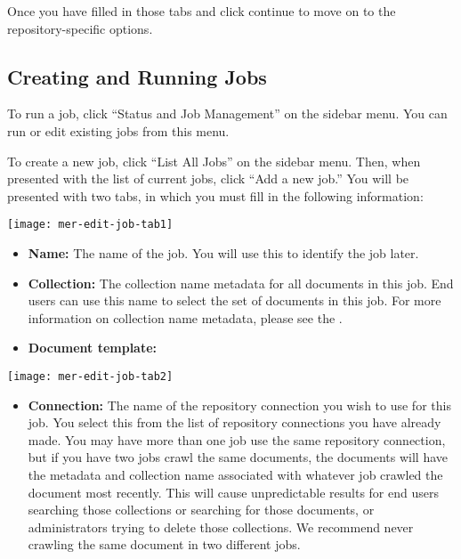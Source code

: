 \begin{changemargin}{1.5in}{0in}


Once you have filled in those tabs and click continue to move on to
the repository-specific options.



\subsection{Creating and Running Jobs}

To run a job, click ``Status and Job Management'' on the sidebar menu.
You can run or edit existing jobs from this menu.

To create a new job, click ``List All Jobs'' on the sidebar menu. Then, when
presented with the list of current jobs, click ``Add a new job.'' You
will be presented with two tabs, in which you must fill in the following
information:

\texttt{[image: mer-edit-job-tab1]}

\begin{itemize}

\item \textbf{Name:} The name of the job. You will use this to identify
the job later.

\item \textbf{Collection:} The collection name metadata for all
documents in this job. End users can use this name to select the set
of documents in this job. For more information on collection name
metadata, please see the .

\item \textbf{Document template:} 

\end{itemize}

\texttt{[image: mer-edit-job-tab2]}

\begin{itemize}

\item \textbf{Connection:} The name of the repository connection you
wish to use for this job. You select this from the list of repository
connections you have already made. You may have more than one job
use the same repository connection, but if you have two jobs crawl the
same documents, the documents will have the metadata and collection name
associated with whatever job crawled the document most recently. This will
cause unpredictable results for end users searching those collections
or searching for those documents, or administrators trying to delete
those collections.  We recommend never crawling the same document in
two different jobs.


\end{itemize}
\end{changemargin}
